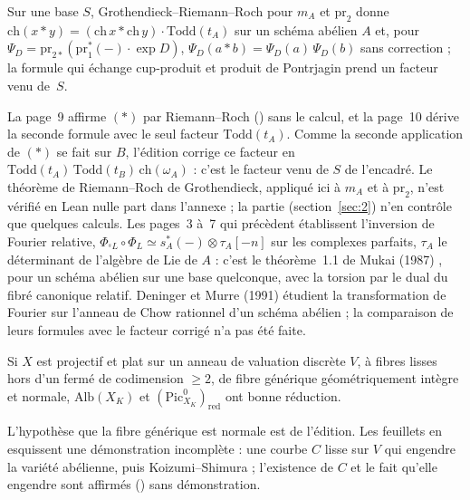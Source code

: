 \begin{encadre}
\begin{theoreme*}\nonverifie
Sur une base $S$, Grothendieck--Riemann--Roch pour $m_A$ et $\mathrm{pr}_2$ donne $\mathrm{ch}(x * y) = (\mathrm{ch}\,x * \mathrm{ch}\,y)\cdot\mathrm{Todd}(t_A)$ sur un schéma abélien $A$ et, pour $\Psi_D = \mathrm{pr}_{2*}(\mathrm{pr}_1^*(-)\cdot\exp D)$, $\Psi_D(a * b) = \Psi_D(a)\,\Psi_D(b)$ sans correction ; la formule qui échange cup-produit et produit de Pontrjagin prend un facteur venu de~$S$.
\end{theoreme*}
\end{encadre}
{\small La page~9 affirme $(\ast)$ par Riemann--Roch () sans le calcul, et la page~10 dérive la seconde formule avec le seul facteur $\mathrm{Todd}(t_A)$. Comme la seconde application de $(\ast)$ se fait sur $B$, l'édition corrige ce facteur en $\mathrm{Todd}(t_A)\,\mathrm{Todd}(t_B)\,\mathrm{ch}(\omega_A)$ : c'est le facteur venu de $S$ de l'encadré. Le théorème de Riemann--Roch de Grothendieck, appliqué ici à $m_A$ et à $\mathrm{pr}_2$, n'est vérifié en Lean nulle part dans l'annexe ; la partie  (section~\ref{sec:2}) n'en contrôle que quelques calculs. Les pages~3 à~7 qui précèdent établissent l'inversion de Fourier relative, $\Phi_{{}^sL} \circ \Phi_L \simeq s_A^*(-) \otimes \tau_A[-n]$ sur les complexes parfaits, $\tau_A$ le déterminant de l'algèbre de Lie de $A$ : c'est le théorème~1.1 de Mukai (1987) \cite{mukai1987}, pour un schéma abélien sur une base quelconque, avec la torsion par le dual du fibré canonique relatif. Deninger et Murre (1991) \cite{deningermurre1991} étudient la transformation de Fourier sur l'anneau de Chow rationnel d'un schéma abélien ; la comparaison de leurs formules avec le facteur corrigé n'a pas été faite.\par}

\begin{encadre}
\begin{theoreme*}\nonverifie
Si $X$ est projectif et plat sur un anneau de valuation discrète $V$, à fibres lisses hors d'un fermé de codimension $\geq 2$, de fibre générique géométriquement intègre et normale, $\mathrm{Alb}(X_K)$ et $(\mathrm{Pic}^0_{X_K})_{\mathrm{red}}$ ont bonne réduction.
\end{theoreme*}
\end{encadre}
{\small L'hypothèse que la fibre générique est normale est de l'édition. Les feuillets en esquissent une démonstration incomplète : une courbe $C$ lisse sur $V$ qui engendre la variété abélienne, puis Koizumi--Shimura ; l'existence de $C$ et le fait qu'elle engendre sont affirmés () sans démonstration.\par}

